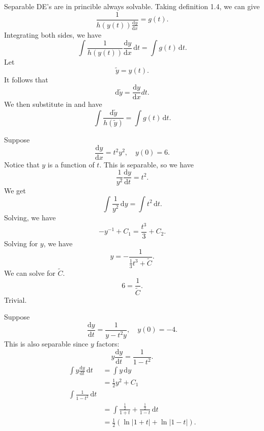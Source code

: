 Separable DE's are in princible always solvable. Taking definition 1.4, we can give
\[
	\frac{1}{h(y(t))\frac{\mathrm{d}y}{\mathrm{d}x} }=g(t)
.\]
Integrating both sides, we have
\[
	\int \frac{1}{h(y(t))}\frac{\mathrm{d}y}{\mathrm{d}x}  \,\mathrm{d} t=\int g(t) \,\mathrm{d} t
.\]
Let
\[
	\tilde{y}=y(t)
.\]
It follows that
\[
	\mathrm{d} \tilde{y}=\frac{\mathrm{d}y}{\mathrm{d}x} dt
.\]
We then substitute in and have
\[
	\int \frac{\mathrm{d} \tilde{y}}{h\left( \tilde{y} \right) } =\int g(t) \,\mathrm{d} t
.\]
\begin{example}
	Suppose
	\[
		\frac{\mathrm{d}y}{\mathrm{d}x} =t^2y^2,\quad y(0)=6
	.\]
	Notice that $y$ is a function of $t$. This is separable, so we have
	\[
		\frac{1}{y^2}\frac{\mathrm{d}y}{\mathrm{d}t} =t^2
	.\]
	We get
	\[
		\int \frac{1}{y^2} \,\mathrm{d} y=\int t^2 \,\mathrm{d} t
	.\]
	Solving, we have
	\[
		-y^{-1}+C_1=\frac{t^3}{3}+C_2
	.\]
	Solving for $y$, we have
	\[
		y=-\frac{1}{\frac{1}{3}t^3+\tilde{C}}
	.\]
	We can solve for $\tilde{C}$.
	\[
		6=\frac{1}{\tilde{C}}
	.\]
	Trivial.
\end{example}
\begin{example}
	Suppose
	\[
		\frac{\mathrm{d}y}{\mathrm{d}t} =\frac{1}{y-t^2y},\quad y(0)=-4
	.\]
	This is also separable since $y$ factors:
	\[
		y \frac{\mathrm{d}y}{\mathrm{d}t} =\frac{1}{1-t^2}
	.\]
	\begin{align*}
		\int y \frac{\mathrm{d}y}{\mathrm{d}t}  \,\mathrm{d} t&=\int y \,\mathrm{d} y\\
								      &=\frac{1}{2}y^2 + C_1\\
								      \int \frac{1}{1-t^2} \,\mathrm{d} t\\
								      &=\int \frac{\frac{1}{2}}{1+t}+\frac{\frac{1}{2}}{1-t} \,\mathrm{d}t\\
								      &=\frac{1}{2}\left( \ln \left| 1+t \right| +\ln \left| 1-t \right|  \right) 
	.\end{align*}
\end{example}
